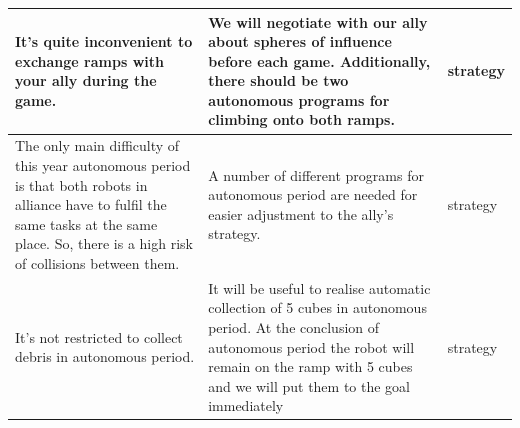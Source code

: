 \begin{table}[H]
\begin{center}
\begin{tabular}{|p{0.4\linewidth}|p{0.5\linewidth}|p{0.1\linewidth}|}
				\hline
				It's quite inconvenient to exchange ramps with your ally during the game. & We will negotiate with our ally about spheres of influence before each game. Additionally, there should be two autonomous programs for climbing onto both ramps. & strategy \\
				\hline
				The only main difficulty of this year autonomous period is that both robots in alliance have to fulfil the same tasks at the same place. So, there is a high risk of collisions between them. & A number of different programs for autonomous period are needed for easier adjustment to the ally's strategy. & strategy \\
				\hline
				It's not restricted to collect debris in autonomous period. & It will be useful to realise automatic collection of 5 cubes in autonomous period. At the conclusion of autonomous period the robot will remain on the ramp with 5 cubes and we will put them to the goal immediately & strategy \\
				\hline
			\end{tabular}
		\end{center}
	\end{table}
	
